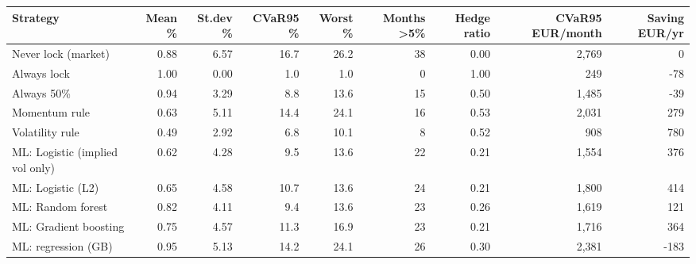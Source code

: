 \begin{tabular}{lrrrrrrrr}
\toprule
Strategy & Mean \% & St.dev \% & CVaR95 \% & Worst \% & Months >5\% & Hedge ratio & CVaR95 EUR/month & Saving EUR/yr \\
\midrule
Never lock (market) & 0.88 & 6.57 & 16.7 & 26.2 & 38 & 0.00 & 2,769 & 0 \\
Always lock & 1.00 & 0.00 & 1.0 & 1.0 & 0 & 1.00 & 249 & -78 \\
Always 50\% & 0.94 & 3.29 & 8.8 & 13.6 & 15 & 0.50 & 1,485 & -39 \\
Momentum rule & 0.63 & 5.11 & 14.4 & 24.1 & 16 & 0.53 & 2,031 & 279 \\
Volatility rule & 0.49 & 2.92 & 6.8 & 10.1 & 8 & 0.52 & 908 & 780 \\
ML: Logistic (implied vol only) & 0.62 & 4.28 & 9.5 & 13.6 & 22 & 0.21 & 1,554 & 376 \\
ML: Logistic (L2) & 0.65 & 4.58 & 10.7 & 13.6 & 24 & 0.21 & 1,800 & 414 \\
ML: Random forest & 0.82 & 4.11 & 9.4 & 13.6 & 23 & 0.26 & 1,619 & 121 \\
ML: Gradient boosting & 0.75 & 4.57 & 11.3 & 16.9 & 23 & 0.21 & 1,716 & 364 \\
ML: regression (GB) & 0.95 & 5.13 & 14.2 & 24.1 & 26 & 0.30 & 2,381 & -183 \\
\bottomrule
\end{tabular}
